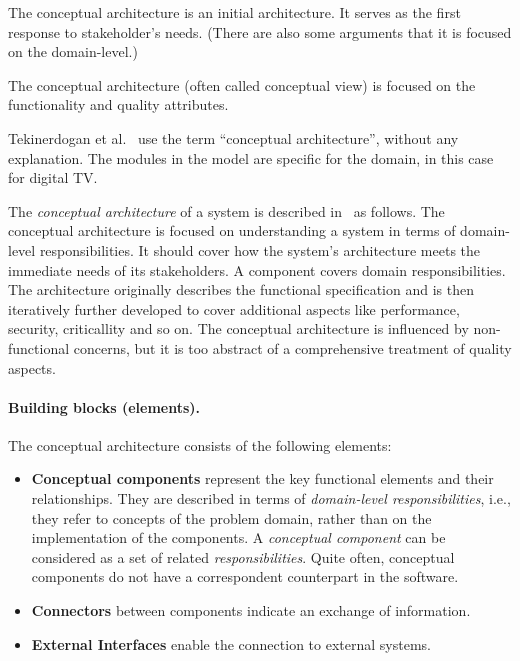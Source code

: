 \documentclass{llncs} %
\newcommand{\ggr}[1]{\textcolor{magenta}{comment Gerd: \textit{#1}}}
\begin{document}
The conceptual architecture is an initial architecture.
It serves as the first response to stakeholder's needs.
(There are also some arguments that it is focused on the domain-level.)

The conceptual architecture (often called conceptual view) is focused
on the functionality and quality attributes.

Tekinerdogan et al.~\cite{Tekinerdogan2008SAR} use the term ``conceptual architecture'',
without any explanation. The modules in the model are specific for the domain,
in this case for digital TV.


The \emph{conceptual architecture} of a system is described in~\cite{Reekie2006ASA} as follows.
The conceptual architecture is focused on understanding a system in terms of
domain-level responsibilities. It should cover how the system's architecture meets
the immediate needs of its stakeholders.
A component covers domain responsibilities. 
The architecture originally describes the functional specification
and is then iteratively further developed to cover additional aspects like performance, security, criticallity and so on.
The conceptual architecture is influenced by non-functional concerns,
but it is too abstract of a comprehensive treatment of quality aspects.

\paragraph{Building blocks (elements).}

The conceptual architecture consists of the following elements:
\begin{itemize}
	\item \textbf{Conceptual components} represent the key functional elements and their relationships.
	They are described in terms of \emph{domain-level responsibilities}, i.e., they refer to
	concepts of the problem domain, rather than on the implementation of the components.
	A \emph{conceptual component} can be considered as a set of related \emph{responsibilities}.
	Quite often, conceptual components do not have a correspondent counterpart in the software.
	\item \textbf{Connectors} between components indicate an exchange of information.
	\item \textbf{External Interfaces} enable the connection to external systems. 
\end{itemize}
\end{document}
